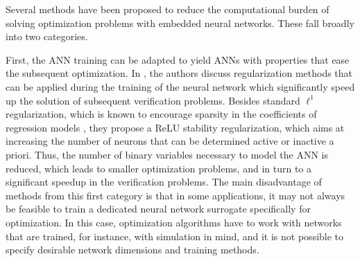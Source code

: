 Several methods have been proposed to reduce the computational burden of solving optimization problems with embedded neural networks. These fall broadly into two categories. 

First, the ANN training can be adapted to yield ANNs with properties that ease the subsequent optimization. In \citet{Xiao2019}, the authors discuss regularization methods that can be applied during the training of the neural network which significantly speed up the solution of subsequent verification problems. Besides standard $\ell^1$ regularization, which is known to encourage sparsity in the coefficients of regression models \citep{Tibshirani1996}, they propose a ReLU stability regularization, which aims at increasing the number of neurons that can be determined active or inactive a priori. Thus, the number of binary variables necessary to model the ANN is reduced, which leads to smaller optimization problems, and in turn to a significant speedup in the verification problems.
%
The main disadvantage of methods from this first category is that in some applications, it may not always be feasible to train a dedicated neural network surrogate specifically for optimization. In this case, optimization algorithms have to work with networks that are trained, for instance, with simulation in mind, and it is not possible to specify desirable network dimensions and training methods.

